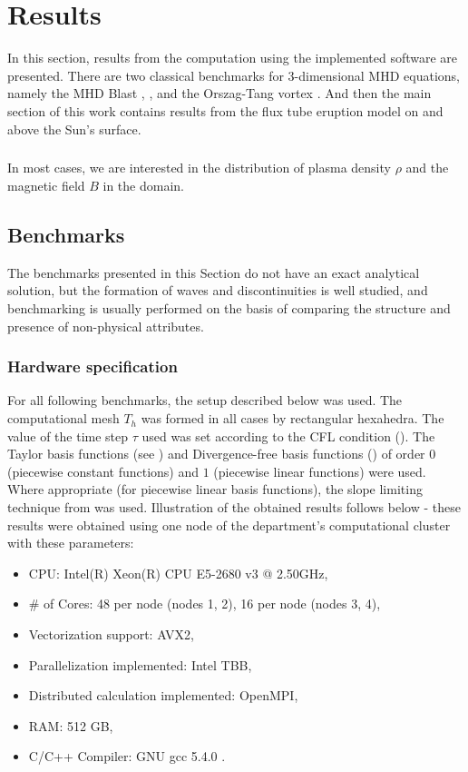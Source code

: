 \chapter{Results}
In this section, results from the computation using the implemented software are presented. There are two classical benchmarks for 3-dimensional MHD equations, namely the MHD Blast \cite{blast1}, \cite{blast2}, and the Orszag-Tang vortex \cite{vortex}. And then the main section of this work contains results from the flux tube eruption model on and above the Sun's surface.
\paragraph{}
In most cases, we are interested in the distribution of plasma density $\rho$ and the magnetic field $B$ in the domain.

\section{Benchmarks}

The benchmarks presented in this Section do not have an exact analytical solution, but the formation of waves and discontinuities is well studied, and benchmarking is usually performed on the basis of comparing the structure and presence of non-physical attributes.
\subsection{Hardware specification}
For all following benchmarks, the setup described below was used. The computational mesh $T_h$ was formed in all cases by rectangular hexahedra.
The value of the time step $\tau$ used was set according to the CFL condition ().
The Taylor basis functions (see \cite{vertex}) and Divergence-free basis functions () of order $0$ (piecewise constant functions) and $1$ (piecewise linear functions) were used.
Where appropriate (for piecewise linear basis functions), the slope limiting technique from  was used.
Illustration of the obtained results follows below - these results were obtained using one node of the department's computational cluster with these parameters:
\begin{itemize}
    \item CPU: Intel(R) Xeon(R) CPU E5-2680 v3 @ 2.50GHz,
    \item \# of Cores: 48 per node (nodes 1, 2), 16 per node (nodes 3, 4),
    \item Vectorization support: AVX2,
    \item Parallelization implemented: Intel TBB,
    \item Distributed calculation implemented: OpenMPI,
    \item RAM: 512 GB,
    \item C/C++ Compiler: GNU gcc 5.4.0 .
\end{itemize}

